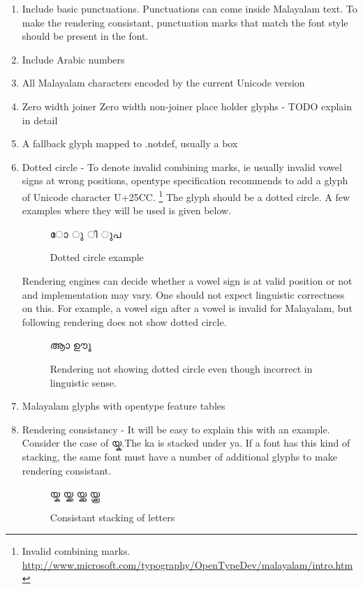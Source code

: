 \begin{enumerate}
\item Include basic punctuations. Punctuations can come inside Malayalam text.
To make the rendering consistant, punctuation marks that match the font style 
should be present in the font.
\item Include Arabic numbers
\item All Malayalam characters encoded by the current Unicode version
\item Zero width joiner Zero width non-joiner place holder glyphs - TODO 
explain in detail
\item A fallback glyph mapped to .notdef, usually a box
\item Dotted circle - To denote invalid combining marks, ie usually invalid 
vowel signs at wrong positions, opentype specification 
recommends to add a glyph of Unicode character U+25CC.
\footnote{Invalid combining marks. \url{http://www.microsoft.com/typography/OpenTypeDev/malayalam/intro.htm}}
The glyph should be a 
dotted circle. A few examples where they will be used is given below.
\begin{figure}[h]
  \centering
  {\meera\textexample ോ ു ി ുപ }\\
  \caption{Dotted circle example}
\end{figure}

Rendering engines can decide whether a vowel sign is at valid position or not 
and implementation may vary.
One should not expect linguistic correctness on this. For example, a vowel sign 
after a vowel is invalid for Malayalam, but following rendering does not show 
dotted circle.

\begin{figure}[h]
  \centering
  {\meera\textexample ആാ ഊൂ }\\
  \caption{Rendering not showing dotted circle even though incorrect in linguistic sense.}
\end{figure}

\item Malayalam glyphs with opentype feature tables
\item Rendering consistancy - It will be easy to explain this with an example. 
Consider the case of {\malayalam യ്ക}.The ka is stacked under ya. If a font has
this kind of stacking, the same font must have a number of additional glyphs to 
make rendering consistant.
\begin{figure}[h]
  \centering
  {\meera\textexample യ്ക യ്ക്ക യ്ക്കു യ്ക്കൂ }\\
  \caption{Consistant stacking of letters}
\end{figure}


\end{enumerate}
